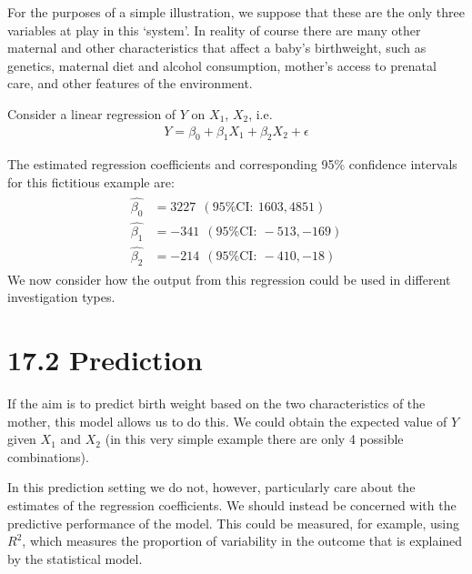 \documentclass[letterpaper,10pt,english]{jupyterBook}
\begin{document}
\sphinxAtStartPar
For the purposes of a simple illustration, we suppose that these are the only three variables at play in this ‘system’. In reality of course there are many other maternal and other characteristics that affect a baby’s birthweight, such as genetics, maternal diet and alcohol consumption, mother’s access to prenatal care, and other features of the environment.

\sphinxAtStartPar
Consider a linear regression of \(Y\) on \(X_{1}\), \(X_{2}\), i.e.
\begin{equation*}
\begin{split}
Y = \beta_{0} + \beta_{1}X_{1} + \beta_{2}X_{2} + \epsilon
\end{split}
\end{equation*}


\sphinxAtStartPar
The estimated regression coefficients and corresponding 95\% confidence intervals for this fictitious example are:
\begin{equation*}
\begin{split}
\begin{align*}
\hat{\beta_{0}} &= 3227 \ \ (95\% \text{CI}:   \  1603, 4851) \\
\hat{\beta_{1}} &= −341 \ \  (95\% \text{CI}:  \  −513, −169) \\
\hat{\beta_{2}} &= −214 \ \  (95\%  \text{CI}:  \  −410, −18)
\end{align*}
\end{split}
\end{equation*}
\sphinxAtStartPar
We now consider how the output from this regression could be used in different investigation types.


\section{17.2 Prediction}
\label{\detokenize{17. Investigations round up:prediction}}
\sphinxAtStartPar
If the aim is to predict birth weight based on the two characteristics of the mother, this model allows us to do this. We could obtain the expected value of \(Y\) given \(X_{1}\) and \(X_{2}\) (in this very simple example there are only 4 possible combinations).

\sphinxAtStartPar
In this prediction setting we do not, however, particularly care about the estimates of the regression coefficients. We should instead be concerned with the predictive performance of the model. This could be measured, for example, using \(R^2\), which measures the proportion of variability in the outcome that is explained by the statistical model.
\end{document}

